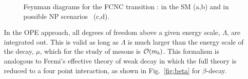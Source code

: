 \begin{figure}[!tb]
\begin{subfigure}{0.49\textwidth}
\caption{}
\label{fig:btosll:c}
\end{subfigure}
\begin{subfigure}{0.49\textwidth}
\caption{}
\label{fig:btosll:d}
\end{subfigure}
\caption{Feynman diagrams for the FCNC transition \btosll: in the SM (a,b) and in possible NP scenarios~\cite{Gauld:2013qja,Altmannshofer:2014cfa,Crivellin:2015mga} (c,d).}
\label{fig:btosll}
\end{figure}

In the OPE approach, all degrees of freedom above a given energy scale, $\Lambda$, are integrated out. This is valid as long as $\Lambda$ is much larger than the energy scale of the decay, $\mu$, which for the study of \B mesons is ${\mathcal{O}}(m_{{b}})$. This formalism is analogous to Fermi's effective theory of weak decay in which the full theory is reduced to a four point interaction, as shown in Fig.~\ref{fig:beta} for $\beta$-decay.


